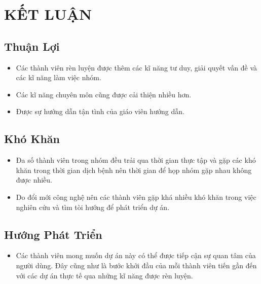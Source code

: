 \chapter{KẾT LUẬN}

\section{Thuận Lợi}

\begin{itemize}
		 \item Các thành viên rèn luyện được thêm các kĩ năng tư duy, giải quyết vấn đề và các kĩ năng làm việc nhóm.
		 \item Các kĩ năng chuyên môn cũng được cải thiện nhiều hơn.
		 \item Được sự hướng dẫn tận tình của giáo viên hướng dẫn.
\end{itemize}
	
\section{Khó Khăn}

\begin{itemize}
\item Đa số thành viên trong nhóm đều trải qua thời gian thực tập và gặp các khó khăn trong thời gian dịch bệnh nên thời gian để họp nhóm gặp nhau không được nhiều.
\item Do đổi mới công nghệ nên các thành viên gặp khá nhiều khó khăn trong việc nghiên cứu và tìm tòi hướng để phát triển dự án.
\end{itemize}
	
\section{Hướng Phát Triển}

\begin{itemize}
\item Các thành viên mong muốn dự án này có thể được tiếp cận sự quan tâm của người dùng. Đây cũng như là bước khởi đầu của mỗi thành viên tiến gần đến với các dự án thực tế qua những kĩ năng được rèn luyện.
\end{itemize}
